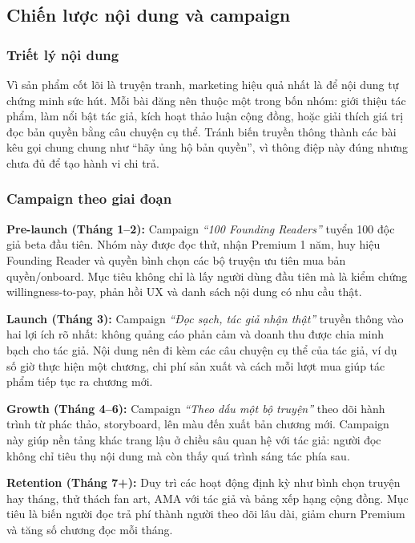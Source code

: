\subsection{Chiến lược nội dung và campaign}

\subsubsection{Triết lý nội dung}

Vì sản phẩm cốt lõi là truyện tranh, marketing hiệu quả nhất là để nội dung tự chứng minh sức hút. Mỗi bài đăng nên thuộc một trong bốn nhóm: giới thiệu tác phẩm, làm nổi bật tác giả, kích hoạt thảo luận cộng đồng, hoặc giải thích giá trị đọc bản quyền bằng câu chuyện cụ thể. Tránh biến truyền thông thành các bài kêu gọi chung chung như ``hãy ủng hộ bản quyền'', vì thông điệp này đúng nhưng chưa đủ để tạo hành vi chi trả.

\subsubsection{Campaign theo giai đoạn}

\textbf{Pre-launch (Tháng 1--2):} Campaign \textit{``100 Founding Readers''} tuyển 100 độc giả beta đầu tiên. Nhóm này được đọc thử, nhận Premium 1 năm, huy hiệu Founding Reader và quyền bình chọn các bộ truyện ưu tiên mua bản quyền/onboard. Mục tiêu không chỉ là lấy người dùng đầu tiên mà là kiểm chứng willingness-to-pay, phản hồi UX và danh sách nội dung có nhu cầu thật.

\textbf{Launch (Tháng 3):} Campaign \textit{``Đọc sạch, tác giả nhận thật''} truyền thông vào hai lợi ích rõ nhất: không quảng cáo phản cảm và doanh thu được chia minh bạch cho tác giả. Nội dung nên đi kèm các câu chuyện cụ thể của tác giả, ví dụ số giờ thực hiện một chương, chi phí sản xuất và cách mỗi lượt mua giúp tác phẩm tiếp tục ra chương mới.

\textbf{Growth (Tháng 4--6):} Campaign \textit{``Theo dấu một bộ truyện''} theo dõi hành trình từ phác thảo, storyboard, lên màu đến xuất bản chương mới. Campaign này giúp nền tảng khác trang lậu ở chiều sâu quan hệ với tác giả: người đọc không chỉ tiêu thụ nội dung mà còn thấy quá trình sáng tác phía sau.

\textbf{Retention (Tháng 7+):} Duy trì các hoạt động định kỳ như bình chọn truyện hay tháng, thử thách fan art, AMA với tác giả và bảng xếp hạng cộng đồng. Mục tiêu là biến người đọc trả phí thành người theo dõi lâu dài, giảm churn Premium và tăng số chương đọc mỗi tháng.

